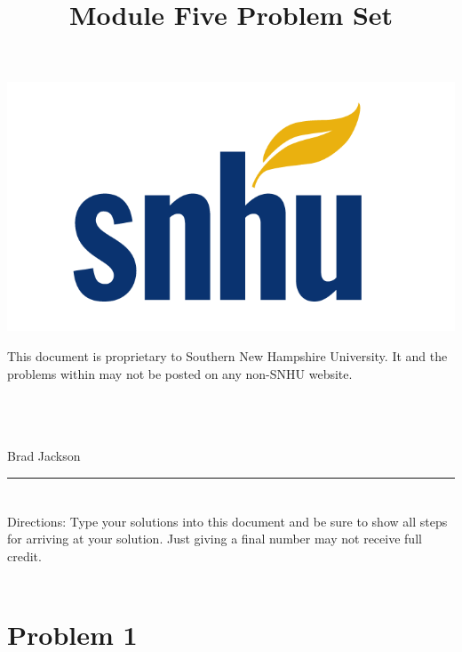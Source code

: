 \documentclass{amsart}
\theoremstyle{definition}
\theoremstyle{Exercise}
\theoremstyle{remark}
\theoremstyle{rule}
\numberwithin{equation}{section}
\begin{document}
\begin{center}
\includegraphics[scale=.1]{snhu_logo.png}
\end{center}
\title{\sf Module Five Problem Set}%


\maketitle
This document is proprietary to Southern New Hampshire University. It and the problems within may not be posted on any non-SNHU website.\\\\\\\\
\begin{center}
Brad Jackson
\end{center}


\begin{center}
\rule{\textwidth}{0.4pt}
\end{center}


\newpage

\section*{}
\section*{}
Directions: Type your solutions into this document and be sure to show all steps for arriving at your solution. Just giving a final number may not receive full credit.
\\\\
\section*{Problem 1}
\end{document}
